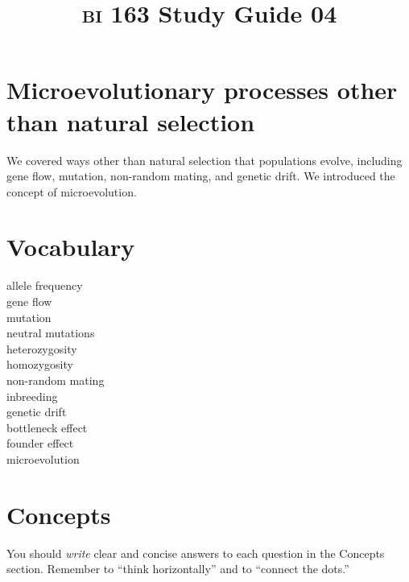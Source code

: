 \documentclass[letterpaper]{tufte-handout}
\title{{\scshape bi} 163 Study Guide 04}
\date{} %
\begin{document}
\maketitle	%

\section*{Microevolutionary processes other than natural selection}

We covered ways other than natural selection that populations evolve, including gene flow, mutation, non-random mating, and genetic drift. We introduced the concept of microevolution.

\section*{Vocabulary}

\vspace{-1\baselineskip}
\begin{multicols}{2}
allele frequency \\
gene flow \\
mutation \\
neutral mutations \\
heterozygosity \\
homozygosity \\
non-random mating \\
inbreeding \\
genetic drift \\
bottleneck effect \\
founder effect \\
microevolution 

\end{multicols}

\section*{Concepts}

You should \emph{write} clear and concise answers to each question in the Concepts section.  
Remember to ``think horizontally'' and to ``connect the dots.'' 
\end{document}
